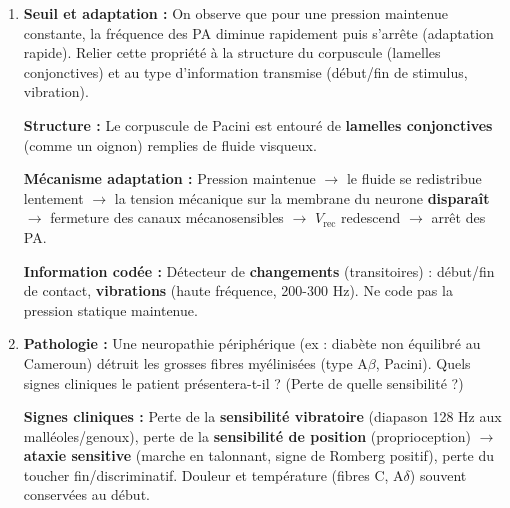 \documentclass[11pt]{article}
\begin{document}
\begin{exercice}
\begin{enumerate}
\item \textbf{Seuil et adaptation :} On observe que pour une pression maintenue constante, la fréquence des PA diminue rapidement puis s'arrête (adaptation rapide). Relier cette propriété à la structure du corpuscule (lamelles conjonctives) et au type d'information transmise (début/fin de stimulus, vibration).
\par \textbf{Structure :} Le corpuscule de Pacini est entouré de \textbf{lamelles conjonctives} (comme un oignon) remplies de fluide visqueux.
\par \textbf{Mécanisme adaptation :} Pression maintenue $\to$ le fluide se redistribue lentement $\to$ la tension mécanique sur la membrane du neurone \textbf{disparaît} $\to$ fermeture des canaux mécanosensibles $\to$ $V_{\text{rec}}$ redescend $\to$ arrêt des PA.
\par \textbf{Information codée :} Détecteur de \textbf{changements} (transitoires) : début/fin de contact, \textbf{vibrations} (haute fréquence, 200-300 Hz). Ne code pas la pression statique maintenue.
\item \textbf{Pathologie :} Une neuropathie périphérique (ex : diabète non équilibré au Cameroun) détruit les grosses fibres myélinisées (type A$\beta$, Pacini). Quels signes cliniques le patient présentera-t-il ? (Perte de quelle sensibilité ?)
\par \textbf{Signes cliniques :} Perte de la \textbf{sensibilité vibratoire} (diapason 128 Hz aux malléoles/genoux), perte de la \textbf{sensibilité de position} (proprioception) $\to$ \textbf{ataxie sensitive} (marche en talonnant, signe de Romberg positif), perte du toucher fin/discriminatif. Douleur et température (fibres C, A$\delta$) souvent conservées au début.
\end{enumerate}
\end{exercice}
\end{document}
